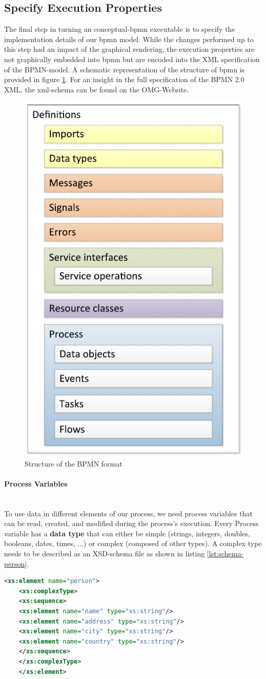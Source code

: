 \subsection{Specify Execution Properties}
The final step in turning an \gls{conceptual-bpmn} executable is to specify the implementation details of our \gls{bpmn} model. While the changes performed up to this step had an impact of the graphical rendering, the execution properties are not graphically embedded into \gls{bpmn} but are encoded into the \gls{XML} specification of the BPMN-model. \cite{fundamentals} A schematic representation of the structure of \gls{bpmn} is provided in figure \ref{fig:bpmn-schema}. For an insight in the full specification of the BPMN 2.0 XML, the \gls{xml}-schema can be found on the OMG-Website\cite{BPMN-xml-spec}. 
\begin{figure}[H]
	\centering
	\includegraphics[width=0.3\columnwidth]{graphics/bpmn-schema}
	\caption{Structure of the BPMN format \cite{fundamentals}} 
	\label{fig:bpmn-schema} 
\end{figure}


\paragraph{Process Variables}~\\
To use data in different elements of our process, we need process variables that can be read, created, and modified during the process's execution. Every Process variable has a \textbf{data type} that can either be simple (strings, integers, doubles, booleans, dates, times, ...) or complex (composed of other types). A complex type needs to be described as an \gls{XSD}-schema file as shown in listing \ref{lst:schema-person}. 

\begin{lstlisting}[language=xml,caption={The \gls{xml}-Schema Definiton for a complex type 'person'},captionpos=b, label={lst:schema-person}]
	<xs:element name="person">
	<xs:complexType>
	<xs:sequence>
	<xs:element name="name" type="xs:string"/>
	<xs:element name="address" type="xs:string"/>
	<xs:element name="city" type="xs:string"/>
	<xs:element name="country" type="xs:string"/>
	</xs:sequence>
	</xs:complexType>
	</xs:element>
\end{lstlisting}

